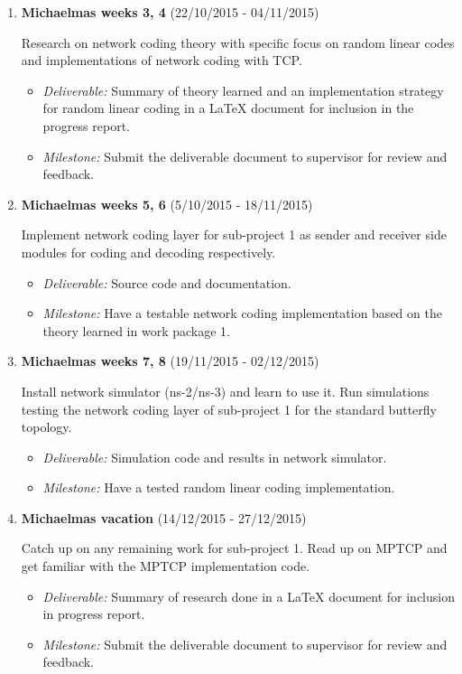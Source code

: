 \documentclass[12pt,a4paper,twoside]{article}
\begin{document}
\begin{enumerate}

\item {\bf Michaelmas weeks 3, 4} (22/10/2015 - 04/11/2015)

Research on network coding theory with specific focus on random linear codes and implementations of network coding with TCP.
\begin{itemize}
  \item {\em Deliverable:} Summary of theory learned and an implementation strategy for random linear coding in a LaTeX document for inclusion in the progress report. 
  \item {\em Milestone:} Submit the deliverable document to supervisor for review and feedback.
\end{itemize}

\item {\bf Michaelmas weeks 5, 6} (5/10/2015 - 18/11/2015)

Implement network coding layer for sub-project 1 as sender and receiver side modules for coding and decoding respectively.
\begin{itemize}
  \item {\em Deliverable:} Source code and documentation.
  \item {\em Milestone:} Have a testable network coding implementation based on the theory learned in work package 1.
\end{itemize}

\item {\bf Michaelmas weeks 7, 8} (19/11/2015 - 02/12/2015)

Install network simulator (ns-2/ns-3) and learn to use it. Run simulations testing the network coding layer of sub-project 1 for the standard butterfly topology.
\begin{itemize}
  \item {\em Deliverable:} Simulation code and results in network simulator.
  \item {\em Milestone:} Have a tested random linear coding implementation.
\end{itemize}

\item {\bf Michaelmas vacation} (14/12/2015 - 27/12/2015)

Catch up on any remaining work for sub-project 1. 
Read up on MPTCP and get familiar with the MPTCP implementation code.
\begin{itemize}
  \item {\em Deliverable:} Summary of research done in a LaTeX document for inclusion in progress report.
  \item {\em Milestone:} Submit the deliverable document to supervisor for review and feedback.
\end{itemize}


\end{enumerate}
\end{document}
